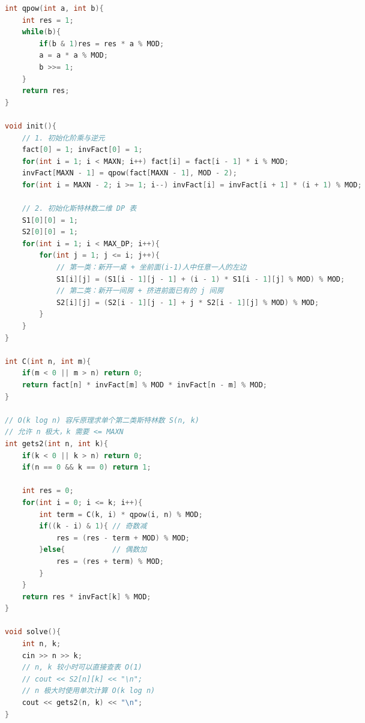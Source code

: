 \documentclass[10pt,landscape,a4paper]{article}
\begin{document}
\begin{multicols*}{3}
\begin{lstlisting}[language=C++]
int qpow(int a, int b){
    int res = 1;
    while(b){
        if(b & 1)res = res * a % MOD;
        a = a * a % MOD;
        b >>= 1;
    }
    return res;
}

void init(){
    // 1. 初始化阶乘与逆元
    fact[0] = 1; invFact[0] = 1;
    for(int i = 1; i < MAXN; i++) fact[i] = fact[i - 1] * i % MOD;
    invFact[MAXN - 1] = qpow(fact[MAXN - 1], MOD - 2);
    for(int i = MAXN - 2; i >= 1; i--) invFact[i] = invFact[i + 1] * (i + 1) % MOD;

    // 2. 初始化斯特林数二维 DP 表
    S1[0][0] = 1;
    S2[0][0] = 1;
    for(int i = 1; i < MAX_DP; i++){
        for(int j = 1; j <= i; j++){
            // 第一类：新开一桌 + 坐前面(i-1)人中任意一人的左边
            S1[i][j] = (S1[i - 1][j - 1] + (i - 1) * S1[i - 1][j] % MOD) % MOD;
            // 第二类：新开一间房 + 挤进前面已有的 j 间房
            S2[i][j] = (S2[i - 1][j - 1] + j * S2[i - 1][j] % MOD) % MOD;
        }
    }
}

int C(int n, int m){
    if(m < 0 || m > n) return 0;
    return fact[n] * invFact[m] % MOD * invFact[n - m] % MOD;
}

// O(k log n) 容斥原理求单个第二类斯特林数 S(n, k)
// 允许 n 极大，k 需要 <= MAXN
int gets2(int n, int k){
    if(k < 0 || k > n) return 0;
    if(n == 0 && k == 0) return 1;
    
    int res = 0;
    for(int i = 0; i <= k; i++){
        int term = C(k, i) * qpow(i, n) % MOD;
        if((k - i) & 1){ // 奇数减
            res = (res - term + MOD) % MOD;
        }else{           // 偶数加
            res = (res + term) % MOD;
        }
    }
    return res * invFact[k] % MOD;
}

void solve(){
    int n, k;
    cin >> n >> k;
    // n, k 较小时可以直接查表 O(1)
    // cout << S2[n][k] << "\n";
    // n 极大时使用单次计算 O(k log n)
    cout << gets2(n, k) << "\n";
}
\end{lstlisting}

\end{multicols*}
\end{document}
